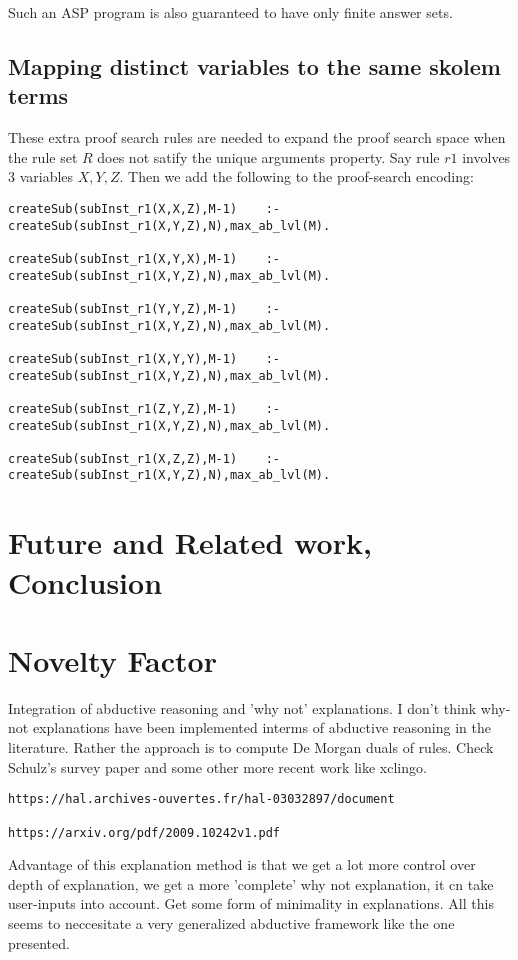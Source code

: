 \documentclass{article}
\begin{document}
Such an ASP program is also guaranteed to have only finite answer sets.

\subsection{Mapping distinct variables to the same skolem terms}
These extra proof search rules are needed to expand the proof search space when the rule set $R$ does not satify the unique arguments property. Say rule $r1$ involves 3 variables $X, Y, Z$. Then we add the following to the proof-search encoding:
\begin{verbatim}
createSub(subInst_r1(X,X,Z),M-1)    :-createSub(subInst_r1(X,Y,Z),N),max_ab_lvl(M).

createSub(subInst_r1(X,Y,X),M-1)    :-createSub(subInst_r1(X,Y,Z),N),max_ab_lvl(M).

createSub(subInst_r1(Y,Y,Z),M-1)    :-createSub(subInst_r1(X,Y,Z),N),max_ab_lvl(M).

createSub(subInst_r1(X,Y,Y),M-1)    :-createSub(subInst_r1(X,Y,Z),N),max_ab_lvl(M).

createSub(subInst_r1(Z,Y,Z),M-1)    :-createSub(subInst_r1(X,Y,Z),N),max_ab_lvl(M).

createSub(subInst_r1(X,Z,Z),M-1)    :-createSub(subInst_r1(X,Y,Z),N),max_ab_lvl(M).
\end{verbatim}

\section{Future and Related work, Conclusion}\label{sec:conclusion}
\section{Novelty Factor}
Integration of abductive reasoning and 'why not' explanations. I don't think why-not explanations have been implemented interms of abductive reasoning in the literature. Rather the approach is to compute De Morgan duals of rules. Check Schulz's survey paper and some other more recent work like xclingo. 
\begin{verbatim}
https://hal.archives-ouvertes.fr/hal-03032897/document

https://arxiv.org/pdf/2009.10242v1.pdf
\end{verbatim}
Advantage of this explanation method is that we get a lot more control over depth of explanation, we get a more 'complete' why not explanation, it cn take user-inputs into account. Get some form of minimality in explanations. All this seems to neccesitate a very generalized abductive framework like the one presented.
\end{document}
